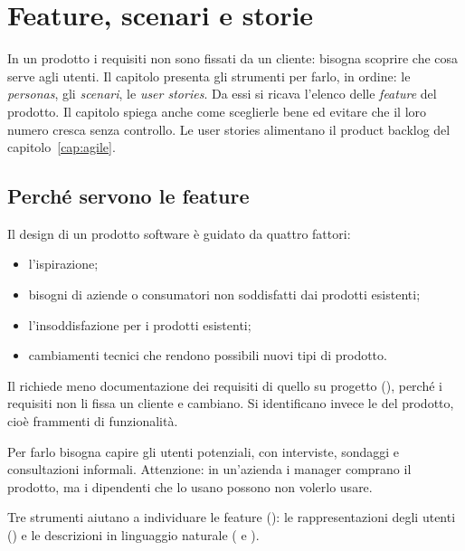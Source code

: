 \chapter{Feature, scenari e storie}
\label{cap:feature}

\begin{inbreve}
In un prodotto i requisiti non sono fissati da un cliente: bisogna scoprire che cosa serve agli utenti. Il capitolo
presenta gli strumenti per farlo, in ordine: le \emph{personas}, gli \emph{scenari}, le \emph{user stories}. Da
essi si ricava l'elenco delle \emph{feature} del prodotto. Il capitolo spiega anche come sceglierle bene ed evitare
che il loro numero cresca senza controllo. Le user stories alimentano il product backlog del capitolo~\ref{cap:agile}.
\end{inbreve}

\section{Perché servono le feature}
\label{sec:feature-intro}

Il design di un prodotto software è guidato da quattro fattori:
\begin{itemize}
  \item l'ispirazione;
  \item bisogni di aziende o consumatori non soddisfatti dai prodotti esistenti;
  \item l'insoddisfazione per i prodotti esistenti;
  \item cambiamenti tecnici che rendono possibili nuovi tipi di prodotto.
\end{itemize}

Il  richiede meno documentazione dei requisiti di quello su progetto
(), perché i requisiti non li fissa un cliente e cambiano. Si identificano invece le
 del prodotto, cioè frammenti di funzionalità.

Per farlo bisogna capire gli utenti potenziali, con interviste, sondaggi e consultazioni informali. Attenzione:
in un'azienda i manager comprano il prodotto, ma i dipendenti che lo usano possono non volerlo usare.

Tre strumenti aiutano a individuare le feature (): le rappresentazioni degli utenti
() e le descrizioni in linguaggio naturale ( e ).

